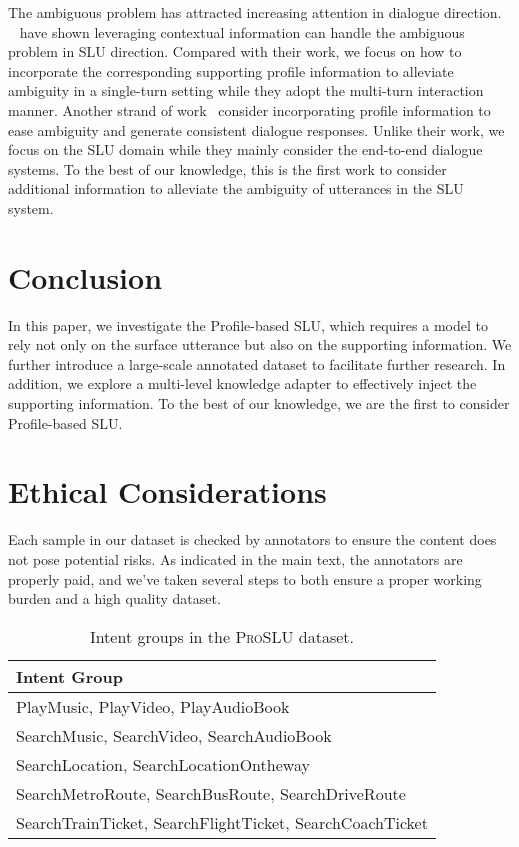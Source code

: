 \documentclass[letterpaper]{article} \usepackage{aaai22}  \usepackage{times}  \usepackage{helvet}  \usepackage{courier}  \usepackage[hyphens]{url}  \usepackage{graphicx} \urlstyle{rm} \def\UrlFont{\rm}  \usepackage{natbib}  \usepackage{caption} \DeclareCaptionStyle{ruled}{labelfont=normalfont,labelsep=colon,strut=off} \frenchspacing  \setlength{\pdfpagewidth}{8.5in}  \setlength{\pdfpageheight}{11in}  \usepackage{algorithm}
\begin{document}
The ambiguous problem has attracted increasing attention in dialogue direction. 
~\citet{bhargava2013easy,xu2014contextual,chen2015leveraging,chen2016end,su-etal-2018-time,qin2021knowing} have shown leveraging contextual information can handle the ambiguous problem in SLU direction.
Compared with their work, we focus on how to incorporate the corresponding supporting profile information to alleviate ambiguity in a single-turn setting while they adopt the multi-turn interaction manner.
Another strand of work~\citet{zhang-etal-2018-personalizing, zheng2019personalized, song-etal-2020-profile} consider incorporating profile information to ease ambiguity and generate consistent dialogue responses.
Unlike their work, we focus on the SLU domain while they mainly consider the end-to-end dialogue systems.
To the best of our knowledge, this is the first work to consider additional information to alleviate the ambiguity of utterances in the SLU system. \section{Conclusion}
\label{conclusion}
In this paper, we investigate the Profile-based SLU, which requires a model to rely not only on the surface utterance but also on the supporting information.
We further introduce a large-scale annotated dataset to facilitate further research.
In addition, we explore a multi-level knowledge adapter to effectively inject the supporting information.
To the best of our knowledge, we are the first to consider Profile-based SLU. 
\appendix


\section*{Ethical Considerations}
Each sample in our dataset is checked by annotators to ensure the content does not pose potential risks. As indicated in the main text, the annotators are properly paid, and we’ve taken several steps to both ensure a proper working burden and a high quality dataset.

\begin{table}[t]
    \centering
    \begin{adjustbox}{width=0.47\textwidth}
        \begin{tabular}{l}
        \toprule
        \textbf{Intent Group} \\ 
        \midrule
        PlayMusic, PlayVideo, PlayAudioBook \\
        SearchMusic, SearchVideo, SearchAudioBook \\
        SearchLocation, SearchLocationOntheway \\
        SearchMetroRoute, SearchBusRoute, SearchDriveRoute \\
        SearchTrainTicket, SearchFlightTicket, SearchCoachTicket \\ 
        \bottomrule
        \end{tabular}
    \end{adjustbox}
    \caption{
        Intent groups in the \textsc{ProSLU} dataset.
    }
    \label{tab:intent-group}
\end{table}
\end{document}
